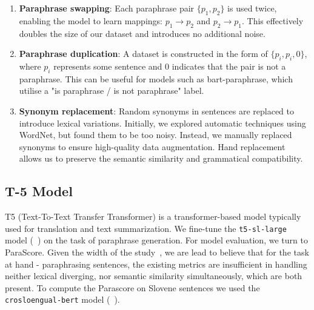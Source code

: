 \documentclass[fleqn,moreauthors,10pt]{ds_report}
\begin{document}
\begin{enumerate}
    \item \textbf{Paraphrase swapping}: Each paraphrase pair $\{p_1, p_2\}$ is used twice, enabling the model to learn mappings: $p_1 \rightarrow p_2$ and $p_2 \rightarrow p_1$. This effectively doubles the size of our dataset and introduces no additional noise.
    \item \textbf{Paraphrase duplication}: A dataset is constructed in the form of $\{p_i, p_i, 0\}$, where $p_i$ represents some sentence and $0$ indicates that the pair is not a paraphrase. This can be useful for models such as bart-paraphrase, which utilise a "is paraphrase / is not paraphrase" label.
    \item \textbf{Synonym replacement}: Random synonyms in sentences are replaced to introduce lexical variations. Initially, we explored automatic techniques using WordNet, but found them to be too noisy. Instead, we manually replaced synonyms to ensure high-quality data augmentation. Hand replacement allows us to preserve the semantic similarity and grammatical compatibility. 
    

\end{enumerate}


\subsection{T-5 Model}

T5 (Text-To-Text Transfer Transformer) is a transformer-based model typically used for translation and text summarization. We fine-tune the \texttt{t5-sl-large} model (~\cite{ulvcar2022sequence}) on the task of paraphrase generation. For model evaluation, we turn to ParaScore. Given the width of the study~\cite{evaluation-metrics-in-paraphrase-generation}, we are lead to believe that for the task at hand - paraphrasing sentences, the existing metrics are insufficient in handling neither lexical diverging, nor semantic similarity simultaneously, which are both present. To compute the Parascore on Slovene sentences we used the \texttt{crosloengual-bert} model (~\cite{ulcar-robnik2020finest}).
\end{document}

